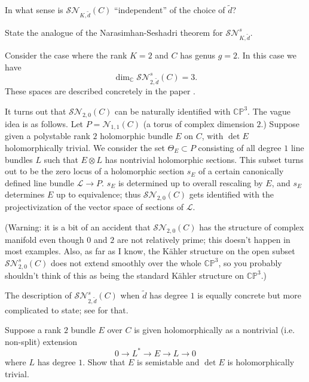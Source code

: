 \documentclass[12pt,letterpaper,reqno]{article}
\numberwithin{equation}{section}
\newcommand{\cL}{\ensuremath{\mathcal L}}
\newcommand{\cS}{\ensuremath{\mathcal S}}
\newcommand{\cN}{\ensuremath{\mathcal N}}
\newcommand{\C}{\ensuremath{\mathbb C}}
\newcommand{\PP}{\ensuremath{\mathbb P}}
\newcommand{\kahler}{K\"ahler\xspace}
\begin{document}
\begin{exercise} In what sense is $\cS\cN_{K,\tilde d}(C)$ ``independent''
of the choice of $\tilde d$?
\end{exercise}

\begin{exercise} State the analogue of the Narasimhan-Seshadri theorem
for $\cS\cN^s_{K,\tilde d}$.
\end{exercise}


\begin{example} Consider the case where the rank $K=2$ and
$C$ has genus $g = 2$. In this case we have 
\begin{equation}
\dim_\C \cS\cN^s_{2,\tilde d}(C) = 3.  
\end{equation}
These spaces are described concretely 
in the paper \cite{MR0242185}. 

It turns out that
$\cS\cN_{2,0}(C)$ can be naturally identified with $\C\PP^3$. 
The vague idea is as follows. 
Let $P = \cN_{1,1}(C)$ (a torus of complex dimension $2$.)
Suppose given a polystable rank $2$ holomorphic bundle $E$ on $C$, with
$\det E$ holomorphically trivial.
We consider the set $\Theta_E \subset P$ consisting of all degree
$1$ line bundles $L$ such that $E \otimes L$ has nontrivial holomorphic
sections. This subset turns out to be the zero locus of a holomorphic 
section $s_E$ of 
a certain canonically defined line bundle $\cL \to P$.
$s_E$ is determined up to overall rescaling by $E$, and
$s_E$ determines $E$ up to equivalence; thus
$\cS\cN_{2,0}(C)$ gets identified with the projectivization
of the vector space of sections of $\cL$.

(Warning: it is a bit of an accident that $\cS\cN_{2,0}(C)$ 
has the structure of complex manifold even though $0$ and $2$
are not relatively prime; this doesn't happen in most 
examples. Also, as far as I know,
the \kahler structure on the open subset $\cS\cN^s_{2,0}(C)$
does not extend smoothly over the whole $\C\PP^3$, so you probably 
shouldn't think of this as being the standard \kahler structure on
$\C\PP^3$.)

The description of $\cS\cN^s_{2,\tilde d}(C)$ when $\tilde d$ has degree 
$1$ is equally concrete but more complicated to state; see \cite{MR0242185}
for that.

\end{example}


\begin{exercise} Suppose
a rank $2$ bundle $E$ over $C$ is given holomorphically as a
nontrivial (i.e. non-split) extension
\begin{equation} 
0 \to L^* \to E \to L \to 0 
\end{equation}
where $L$ has degree $1$.
Show that $E$ is semistable and $\det E$ is holomorphically trivial.
\end{exercise}
\end{document}
